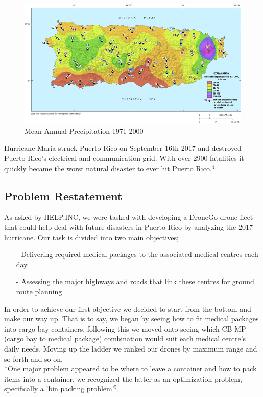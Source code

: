 \documentclass[a4paper,12pt]{article}
\begin{document}
\begin{figure}[h]
\centering
\includegraphics[scale =0.5]{Rainfall}
\caption{Mean Annual Precipitation 1971-2000}
\label{rainfall}
\end{figure}

Hurricane Maria struck Puerto Rico on September 16th 2017 and destroyed Puerto Rico's electrical and communication grid. With over 2900 fatalities it quickly became
the worst natural disaster to ever hit Puerto Rico.$^4$

\subsection{Problem Restatement}
As asked by HELP.INC, we were tasked with developing a DroneGo drone fleet that could help deal with future disasters in
Puerto Rico by analyzing the 2017 hurricane. Our task is divided into two main objectives;
\begin{itemize}
\item[-]Delivering required medical packages to the associated medical centres each day.
\item[-]Assessing the major highways and roads that link these centres for ground route planning
\end{itemize}
In order to achieve our first objective we decided to start from the bottom and make our way up. That is to say, we began by seeing how to fit medical packages into cargo bay containers, following this
we moved onto seeing which CB-MP (cargo bay to medical package) combination would suit each medical centre's daily needs. Moving up the ladder we ranked our drones by maximum range and so forth and so on.
\\*One major problem appeared to be where to leave a container and how to pack items into a container, we recognized the latter as an optimization problem, specifically a 'bin packing problem'$^5$.
\end{document}
